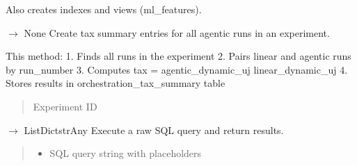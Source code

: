 \documentclass[letterpaper,10pt,english]{sphinxmanual}
\begin{document}
\begin{fulllineitems}
\begin{fulllineitems}
\sphinxAtStartPar
Also creates indexes and views (ml\_features).

\end{fulllineitems}


\begin{fulllineitems}
\label{\detokenize{core.database.base:core.database.base.DatabaseInterface.create_tax_summaries}}
\pysigstartsignatures
\pysiglinewithargsret
{}
{}
{{ $\rightarrow$ None}}
\pysigstopsignatures
\sphinxAtStartPar
Create tax summary entries for all agentic runs in an experiment.

\sphinxAtStartPar
This method:
1. Finds all runs in the experiment
2. Pairs linear and agentic runs by run\_number
3. Computes tax = agentic\_dynamic\_uj \sphinxhyphen{} linear\_dynamic\_uj
4. Stores results in orchestration\_tax\_summary table
\begin{quote}\begin{description}
\sphinxAtStartPar
{} \textendash{} Experiment ID

\end{description}\end{quote}

\end{fulllineitems}


\begin{fulllineitems}
\label{\detokenize{core.database.base:core.database.base.DatabaseInterface.execute}}
\pysigstartsignatures
\pysiglinewithargsret
{}
{\sphinxparamcomma {}}
{{ $\rightarrow$ List\DUrole{p}{{[}}Dict\DUrole{p}{{[}}strAny\DUrole{p}{{]}}\DUrole{p}{{]}}}}
\pysigstopsignatures
\sphinxAtStartPar
Execute a raw SQL query and return results.
\begin{quote}\begin{description}
\begin{itemize}
\item {} 
\sphinxAtStartPar
{} \textendash{} SQL query string with placeholders


\end{itemize}
\end{description}
\end{quote}
\end{fulllineitems}
\end{fulllineitems}
\end{document}
